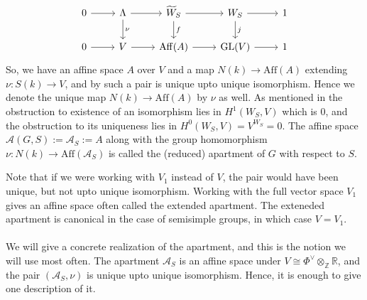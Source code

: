 \documentclass[11 pt]{article}
\numberwithin{equation}{subsection}
\theoremstyle{definition}
\theoremstyle{remark}
\theoremstyle{conjecture}
\newcommand{\GL}{\mathrm{GL}}
\newcommand{\Z}{\mathbb Z}
\newcommand{\R}{\mathbb R}
\newcommand{\A}{\mathcal A}
\begin{document}
\begin{equation*}
    \begin{tikzcd}
        0 \arrow{r} &\Lambda\arrow{r}\arrow{d}{\nu} & \widetilde W_S \arrow{r}\arrow{d}{f}& W_S \arrow{r}\arrow{d}{j}&1\\
        0 \arrow{r}  & V\arrow{r} & \mathrm{Aff}(A) \arrow{r} & \GL(V) \arrow{r}& 1
    \end{tikzcd}
\end{equation*}
So, we have an affine space $A$ over $V$ and a map $N(k) \rightarrow \mathrm{Aff}(A)$ extending $\nu:S(k) \rightarrow V$, and by \cite[Proposition 1.8]{landvogtcompactificationbook}
such a pair is unique upto unique isomorphism. Hence we denote the unique map $N(k) \rightarrow \mathrm{Aff}(A)$ by $\nu $ as well. As mentioned in \cite[Section 2.2]{yu2009bruhat} the obstruction to existence of an isomorphism lies in $H^1(W_S,V)$ which is $0$, and the obstruction to its uniqueness lies in $H^0(W_S,V)=V^{W_S}=0$. The affine space $\A(G,S):=\A_S:=A$ along with the group homomorphism $\nu:N(k)\rightarrow \mathrm{Aff}(\A_S)$ is called the (reduced) apartment of $G$ with respect to $S$. \par 
Note that if we were working with $V_1$ instead of $V$, the pair would have been unique, but not upto unique isomorphism. Working with the full vector space $V_1$ gives an affine space often called the extended apartment. The exteneded apartment is canonical in the case of semisimple groups, in which case $V=V_1$. \paragraph{}

We will give a concrete realization of the apartment, and this is the notion we will use most often. The apartment $\A_S$ is an affine space under $V \cong \Phi^\vee\otimes_\Z\R$, and the pair $(\A_S,\nu)$ is unique upto unique isomorphism. Hence, it is enough to give one description of it. \par
\end{document}
